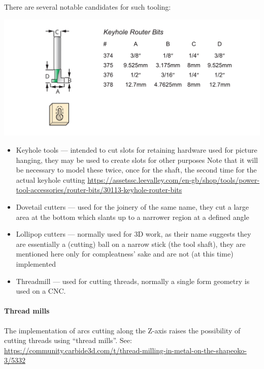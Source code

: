 \documentclass{ltxdoc}
\begin{document}
\begin{samepage}
There are several notable candidates for such tooling:

\noindent\includegraphics[width=\linewidth]{images/keyhole_router_bits.pdf}%

\begin{itemize}
\item Keyhole tools --- intended to cut slots for retaining hardware used for picture
                        hanging, they may be used to create slots for other purposes
                        Note that it will be necessary to model these twice, once for
                        the shaft, the second time for the actual keyhole cutting
                        \url{https://assetssc.leevalley.com/en-gb/shop/tools/power-tool-accessories/router-bits/30113-keyhole-router-bits}
\item Dovetail cutters --- used for the joinery of the same name, they cut a large
                           area at the bottom which slants up to a narrower region
                           at a defined angle
\item Lollipop cutters --- normally used for 3D work, as their name suggests they are
                           essentially a (cutting) ball on a narrow stick (the tool shaft),
                           they are mentioned here only for compleatness' sake and are not
                           (at this time) implemented
\item Threadmill --- used for cutting threads, normally a single form geometry is used on a CNC.
\end{itemize}
\end{samepage}

\paragraph{Thread mills}

\label{para:threadmills} The implementation of arcs cutting along the Z-axis raises the 
possibility of cutting threads using ``thread mills''. 
See: \url{https://community.carbide3d.com/t/thread-milling-in-metal-on-the-shapeoko-3/5332}
\end{document}
